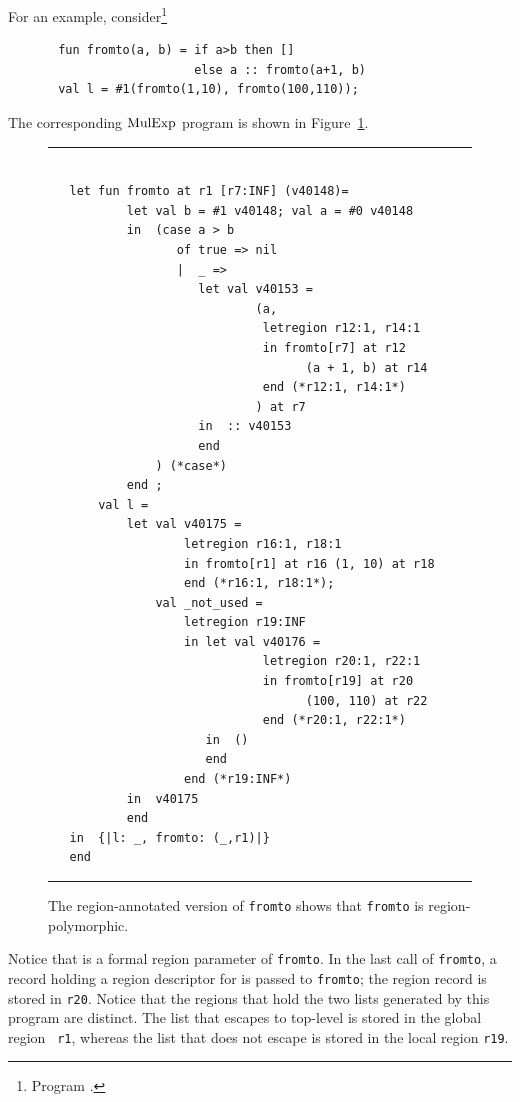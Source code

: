 \documentclass[12pt]{book}
\begin{document}
For an example, consider\footnote{Program .}
\begin{verbatim}
       fun fromto(a, b) = if a>b then []
                          else a :: fromto(a+1, b)
       val l = #1(fromto(1,10), fromto(100,110));
\end{verbatim}
The corresponding $\hbox{\rm MulExp}$ program is shown in Figure~\ref{fromto.fig}.
\begin{figure}
\hrule
\begin{verbatim}

   let fun fromto at r1 [r7:INF] (v40148)= 
           let val b = #1 v40148; val a = #0 v40148
           in  (case a > b 
                  of true => nil
                  |  _ => 
                     let val v40153 = 
                             (a, 
                              letregion r12:1, r14:1 
                              in fromto[r7] at r12 
                                    (a + 1, b) at r14 
                              end (*r12:1, r14:1*)
                             ) at r7
                     in  :: v40153
                     end 
               ) (*case*) 
           end ; 
       val l = 
           let val v40175 = 
                   letregion r16:1, r18:1 
                   in fromto[r1] at r16 (1, 10) at r18 
                   end (*r16:1, r18:1*); 
               val _not_used = 
                   letregion r19:INF 
                   in let val v40176 = 
                              letregion r20:1, r22:1 
                              in fromto[r19] at r20 
                                    (100, 110) at r22 
                              end (*r20:1, r22:1*)
                      in  ()
                      end  
                   end (*r19:INF*)
           in  v40175
           end 
   in  {|l: _, fromto: (_,r1)|}
   end 
\end{verbatim}
\caption{The region-annotated version of {\tt fromto} shows that {\tt fromto}
is region-polymorphic.}
\medskip

\hrule
\label{fromto.fig}
\end{figure}
Notice that  is a formal region parameter of {\tt fromto}.
In the last call of {\tt fromto}, a record holding a
region descriptor for  is passed to {\tt fromto};
the region record is stored in {\tt r20}. Notice that the regions that hold
the two lists generated by this program are distinct. 
The list that escapes to top-level is stored in the global region {\tt
  r1}, whereas the list that does not escape is stored in the local
region {\tt r19}.
\end{document}
